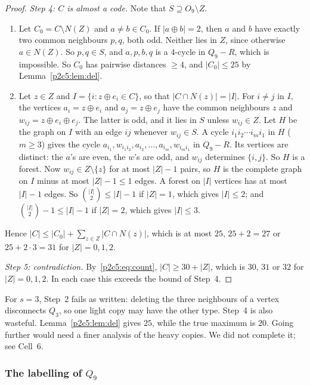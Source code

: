 \begin{proof}
\emph{Step 4: $C$ is almost a code.} Note that $S\supseteq O_9\setminus Z$.
\begin{enumerate}[label=(\roman*)]
\item Let $C_0=C\setminus N(Z)$ and $a\ne b\in C_0$. If $|a\oplus b|=2$, then $a$ and $b$ have exactly
  two common neighbours $p,q$, both odd. Neither lies in $Z$, since otherwise $a\in N(Z)$. So
  $p,q\in S$, and $a,p,b,q$ is a $4$-cycle in $Q_9-R$, which is impossible. So $C_0$ has pairwise
  distances $\ge4$, and $|C_0|\le25$ by Lemma~\ref{p2c5:lem:del}.
\item Let $z\in Z$ and $I=\{i:z\oplus e_i\in C\}$, so that $|C\cap N(z)|=|I|$. For $i\ne j$ in $I$, the
  vertices $a_i=z\oplus e_i$ and $a_j=z\oplus e_j$ have the common neighbours $z$ and
  $w_{ij}=z\oplus e_i\oplus e_j$. The latter is odd, and it lies in $S$ unless $w_{ij}\in Z$. Let
  $H$ be the graph on $I$ with an edge $ij$ whenever $w_{ij}\in S$. A cycle
  $i_1i_2\cdots i_mi_1$ in $H$ ($m\ge3$) gives the cycle
  $a_{i_1},w_{i_1i_2},a_{i_2},\dots,a_{i_m},w_{i_mi_1}$ in $Q_9-R$. Its vertices are distinct: the
  $a$'s are even, the $w$'s are odd, and $w_{ij}$ determines $\{i,j\}$. So $H$ is a forest. Now
  $w_{ij}\in Z\setminus\{z\}$ for at most $|Z|-1$ pairs, so $H$ is the complete graph on $I$ minus
  at most $|Z|-1\le1$ edges. A forest on $|I|$ vertices has at most $|I|-1$ edges. So
  $\binom{|I|}2\le|I|-1$ if $|Z|=1$, which gives $|I|\le2$; and $\binom{|I|}2-1\le|I|-1$ if $|Z|=2$,
  which gives $|I|\le3$.
\end{enumerate}
Hence $|C|\le|C_0|+\sum_{z\in Z}|C\cap N(z)|$, which is at most $25$, $25+2=27$ or $25+2\cdot3=31$
for $|Z|=0,1,2$.

\emph{Step 5: contradiction.} By~\eqref{p2c5:eq:count}, $|C|\ge30+|Z|$, which is $30$, $31$ or $32$
for $|Z|=0,1,2$. In each case this exceeds the bound of Step~4.
\end{proof}

\begin{remark}\label{p2c5:rem:limit}
For $s=3$, Step~2 fails as written: deleting the three neighbours of a vertex disconnects $Q_3$,
so one light copy may have the other type. Step~4 is also wasteful. Lemma~\ref{p2c5:lem:del}
gives $25$, while the true maximum is $20$. Going further would need a finer analysis of the
heavy copies. We did not complete it; see Cell~6.
\end{remark}

\subsubsection{The labelling of $Q_9$}\label{p2c5:sec:lab}

